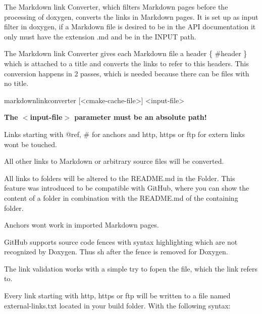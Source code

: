 The Markdown link Converter, which filters Markdown pages before the processing of doxygen, converts the links in Markdown pages. It is set up as input filter in doxygen, if a Markdown file is desired to be in the A\+PI documentation it only must have the extension {\ttfamily .md} and be in the {\ttfamily I\+N\+P\+UT} path.

The Markdown link Converter gives each Markdown file a header {\ttfamily \{ \#header \}} which is attached to a title and converts the links to refer to this headers. This conversion happens in 2 passes, which is needed because there can be files with no title.


\begin{DoxyCode}
markdownlinkconverter [<cmake-cache-file>] <input-file>
\end{DoxyCode}


{\bfseries The $<$input-\/file$>$ parameter must be an absolute path!}


\begin{DoxyItemize}
\item Links starting with {\ttfamily @ref}, {\ttfamily \#} for anchors and {\ttfamily http}, {\ttfamily https} or {\ttfamily ftp} for extern links wont be touched.
\item All other links to Markdown or arbitrary source files will be converted.
\item All links to folders will be altered to the R\+E\+A\+D\+M\+E.\+md in the Folder. This feature was introduced to be compatible with Git\+Hub, where you can show the content of a folder in combination with the R\+E\+A\+D\+M\+E.\+md of the containing folder.
\item Anchors wont work in imported Markdown pages.
\end{DoxyItemize}


\begin{DoxyItemize}
\item Git\+Hub supports source code fences with syntax highlighting which are not recognized by Doxygen. Thus {\ttfamily sh} after the fence is removed for Doxygen.
\end{DoxyItemize}

The link validation works with a simple try to {\ttfamily fopen} the file, which the link refers to.

Every link starting with {\ttfamily http}, {\ttfamily https} or {\ttfamily ftp} will be written to a file named {\ttfamily external-\/links.\+txt} located in your build folder. With the following syntax\+:


